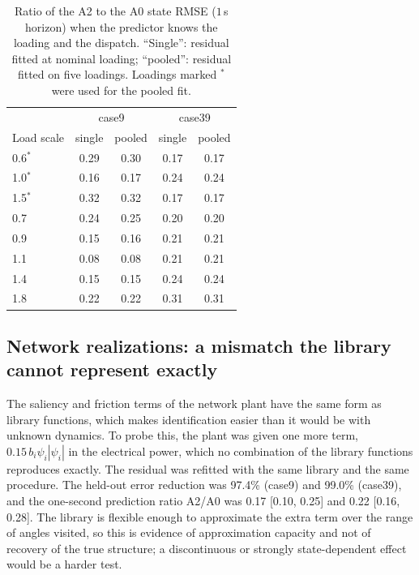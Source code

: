 \documentclass[preprint,12pt]{elsarticle}
\begin{document}
\begin{table}[!t]\centering\small
\caption{Ratio of the A2 to the A0 state RMSE ($1$\,s horizon) when the predictor knows the loading and the dispatch. ``Single'': residual fitted at nominal loading; ``pooled'': residual fitted on five loadings. Loadings marked $^{\ast}$ were used for the pooled fit.}
\label{tab:transfer}
\begin{tabular}{lcccc}
\toprule
 & \multicolumn{2}{c}{case9} & \multicolumn{2}{c}{case39}\\
Load scale & single & pooled & single & pooled\\
\midrule
0.6$^{\ast}$ & 0.29 & 0.30 & 0.17 & 0.17\\
1.0$^{\ast}$ & 0.16 & 0.17 & 0.24 & 0.24\\
1.5$^{\ast}$ & 0.32 & 0.32 & 0.17 & 0.17\\
0.7 & 0.24 & 0.25 & 0.20 & 0.20\\
0.9 & 0.15 & 0.16 & 0.21 & 0.21\\
1.1 & 0.08 & 0.08 & 0.21 & 0.21\\
1.4 & 0.15 & 0.15 & 0.24 & 0.24\\
1.8 & 0.22 & 0.22 & 0.31 & 0.31\\
\bottomrule
\end{tabular}
\end{table}

\subsection{Network realizations: a mismatch the library cannot represent exactly}
\label{sec:ool}
The saliency and friction terms of the network plant have the same form as library functions, which makes identification easier than it would be with unknown dynamics. To probe this, the plant was given one more term, $0.15\,b_i\psi_i|\psi_i|$ in the electrical power, which no combination of the library functions reproduces exactly. The residual was refitted with the same library and the same procedure. The held-out error reduction was 97.4\% (case9) and 99.0\% (case39), and the one-second prediction ratio A2/A0 was 0.17 [0.10, 0.25] and 0.22 [0.16, 0.28]. The library is flexible enough to approximate the extra term over the range of angles visited, so this is evidence of approximation capacity and not of recovery of the true structure; a discontinuous or strongly state-dependent effect would be a harder test.
\end{document}
